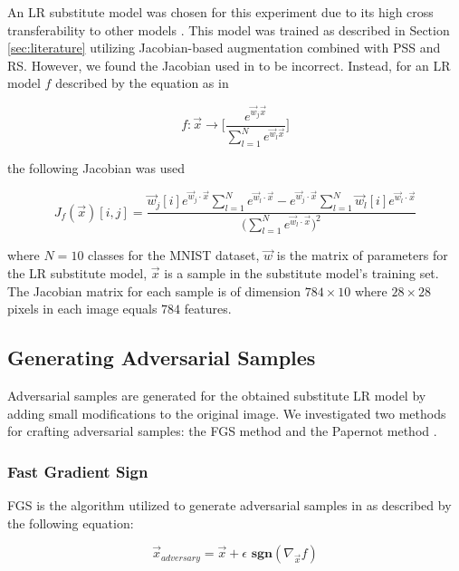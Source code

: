 An LR substitute model was chosen for this experiment due to its high cross transferability to other models \cite{papernot3}. This model was trained as described in Section \ref{sec:literature} utilizing Jacobian-based augmentation combined with PSS and RS. However, we found the Jacobian used in \cite{papernot3} to be incorrect. Instead, for an LR model $f$ described by the equation as in \cite{papernot3}

\begin{equation} \label{LR_prob}
	f: \vec{x} \rightarrow \Bigg[ \frac{e^{\vec{w}_{j}\vec{x}}}{\sum_{l=1}^{N}e^{\vec{w}_{l}\vec{x}}} \Bigg]
\end{equation}

the following Jacobian was used

\begin{equation}
	J_{f}(\vec{x})[i,j] = \frac{\vec{w}_{j}[i] e^{\vec{w}_{j}\cdot \vec{x}}\sum_{l=1}^{N}e^{\vec{w}_{l} \cdot \vec{x}} - e^{\vec{w}_{j} \cdot \vec{x}}\sum_{l=1}^{N}\vec{w}_{l}[i]e^{\vec{w}_{l} \cdot \vec{x}}}{\bigg(\sum_{l=1}^{N}e^{\vec{w}_{l} \cdot \vec{x}}\bigg)^{2}}
\end{equation}

where $N = 10$ classes for the MNIST dataset, $\vec{w}$ is the matrix of parameters for the LR substitute model, $\vec{x}$ is a sample in the substitute model's training set. The Jacobian matrix for each sample is of dimension $784 \times 10$ where $28 \times 28$ pixels in each image equals $784$ features. 

\subsection{Generating Adversarial Samples}
Adversarial samples are generated for the obtained substitute LR model by adding small modifications to the original image. We investigated two methods for crafting adversarial samples: the FGS method \cite{fast_gradient_sign} and the Papernot method \cite{papernot1}.

\subsubsection{Fast Gradient Sign}
FGS is the algorithm utilized to generate adversarial samples in \cite{papernot3} as described by the following equation:

\begin{equation} \label{eqn:fast_gradient_sign}
	\vec{x}_{adversary} = \vec{x} + \epsilon \textbf{ sgn}(\nabla_{\vec{x}}f) 
\end{equation}


